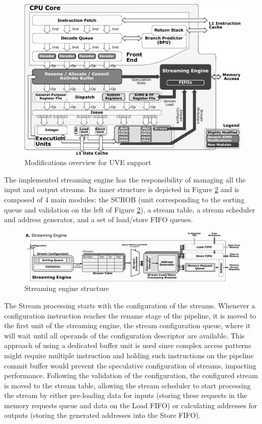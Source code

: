 \begin{figure}[H]
	\begin{center}
 		\includegraphics[width=0.67\linewidth]{images/UVE-arch.pdf}
 		\caption{Modifications overview for UVE support}
 		\label{fig:uve-arch}
	\end{center} 
\end{figure}

The implemented streaming engine has the responsibility of managing all the input and output streams. Its inner structure is depicted in Figure \ref{fig:uve-engine} and is composed of 4 main modules: the \acrfull{SCROB} (unit corresponding to the sorting queue and validation on the left of Figure \ref{fig:uve-engine}), a stream table, a stream scheduler and address generator, and a set of load/store FIFO queues.

\begin{figure}[H]
	\begin{center}
 		\includegraphics[width=0.97\linewidth]{images/uve-engine.pdf}
 		\caption{Streaming engine structure}
 		\label{fig:uve-engine}
	\end{center} 
\end{figure}


The Stream processing starts with the configuration of the streams. Whenever a configuration instruction reaches the rename stage of the pipeline, it is moved to the first unit of the streaming engine, the stream configuration queue, where it will wait until all operands of the configuration descriptor are available. This approach of using a dedicated buffer unit is used since complex access patterns might require multiple instruction and holding such instructions on the pipeline commit buffer would prevent the speculative configuration of streams, impacting performance. Following the validation of the configuration, the configured stream is moved to the stream table, allowing the stream scheduler to start processing the stream by either pre-loading data for inputs (storing these requests in the memory requests queue and data on the Load FIFO) or calculating addresses for outputs (storing the generated addresses into the Store FIFO). 

